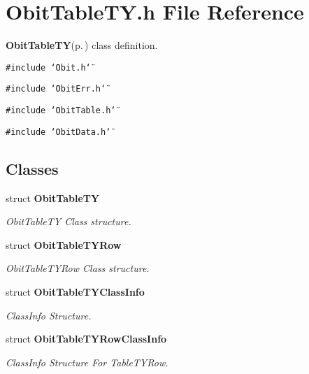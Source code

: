 \section{Obit\-Table\-TY.h File Reference}
\label{ObitTableTY_8h}
{\bf Obit\-Table\-TY}{\rm (p.\,\pageref{structObitTableTY})} class definition. 

{\tt \#include \char`\"{}Obit.h\char`\"{}}\par
{\tt \#include \char`\"{}Obit\-Err.h\char`\"{}}\par
{\tt \#include \char`\"{}Obit\-Table.h\char`\"{}}\par
{\tt \#include \char`\"{}Obit\-Data.h\char`\"{}}\par
\subsection*{Classes}
\begin{CompactItemize}
\item 
struct {\bf Obit\-Table\-TY}
\begin{CompactList}\small\item\em Obit\-Table\-TY Class structure. \item\end{CompactList}\item 
struct {\bf Obit\-Table\-TYRow}
\begin{CompactList}\small\item\em Obit\-Table\-TYRow Class structure. \item\end{CompactList}\item 
struct {\bf Obit\-Table\-TYClass\-Info}
\begin{CompactList}\small\item\em Class\-Info Structure. \item\end{CompactList}\item 
struct {\bf Obit\-Table\-TYRow\-Class\-Info}
\begin{CompactList}\small\item\em Class\-Info Structure For Table\-TYRow. \item\end{CompactList}\end{CompactItemize}
